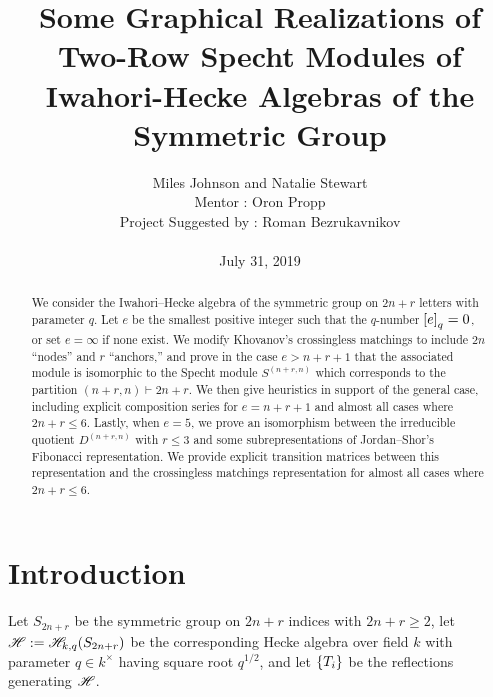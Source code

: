 \documentclass{amsart}
\begin{document}
  \title[Some Graphical Realizations of Two-Row Specht Modules of Hecke Algebras]{Some Graphical Realizations of Two-Row Specht Modules of Iwahori-Hecke Algebras of the Symmetric Group}
  \author[Miles Johnson and Natalie Stewart]{Miles Johnson and Natalie Stewart\\
    Mentor : Oron Propp\\
  Project Suggested by : Roman Bezrukavnikov\\ \; \\
  July 31, 2019
  }

   \begin{titlepage}
    \maketitle
    \begin{abstract}
      We consider the Iwahori--Hecke algebra of the symmetric group on $2n + r$ letters with parameter $q$.
      Let $e$ be the smallest positive integer such that the $q$-number $\left[ e \right]_q = 0$, or set $e = \infty$ if none exist.
      We modify Khovanov's crossingless matchings to include $2n$ ``nodes'' and $r$ ``anchors,'' and prove in the case $e > n + r + 1$ that the associated module is isomorphic to the Specht module $S^{(n+r,n)}$ which corresponds to the partition $(n + r,n) \vdash 2n + r$.
      We then give heuristics in support of the general case, including explicit composition series for $e = n + r + 1$ and almost all cases where $2n + r \leq 6$. 
      Lastly, when $e = 5$, we prove an isomorphism between the irreducible quotient $D^{(n+r,n)}$ with $r \leq 3$ and some subrepresentations of Jordan--Shor's Fibonacci representation.
      We provide explicit transition matrices between this representation and the crossingless matchings representation for almost all cases where $2n + r \leq 6$.
    \end{abstract}

  \begingroup
  \hypersetup{linkcolor=black} %
  \tableofcontents
  \endgroup

  \end{titlepage}

\section{Introduction} 
  Let $S_{2n+r}$ be the symmetric group on $2n+r$ indices with $2n + r \geq 2$, let $\mathscr{H} := \mathscr{H}_{k,q}(S_{2n+r})$ be the corresponding Hecke algebra over field $k$ with parameter $q \in k^\times$ having square root $q^{1/2}$, and let $\left\{ T_i \right\}$ be the reflections generating $\mathscr{H}$.
  
\end{document}
